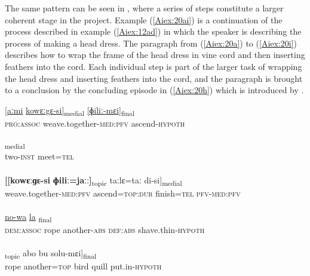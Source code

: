 \documentclass[output=paper]{LSP/langsci}
\begin{document}
	The same pattern can be seen in , where a series of steps constitute a larger coherent stage in the project. Example (\ref{Aiex:20ai}) is a continuation of the process described in example (\ref{Aiex:12ad}) in which the speaker is describing the process of making a head dress. The paragraph from (\ref{Aiex:20a}) to (\ref{Aiex:20i}) describes how to wrap the frame of the head dress in vine cord and then inserting feathers into the cord. Each individual step is part of the larger task of wrapping the head dress and inserting feathers into the cord, and the paragraph is brought to a conclusion by the concluding episode in (\ref{Aiex:20h}) which is introduced by .
	\begin{exe}
\ex \label{Aiex:20ai}
\begin{xlist}
\ex \label{Aiex:20a}
\gll \underline{[aːmi}		\underline{kowɛːgɛ-si]}\textsubscript{medial}	\underline{[ɸiliː-mɛi]}\textsubscript{final}\\
\textsc{pro:assoc}	weave.together\textsc{-med:pfv}	ascend\textsc{-hypoth}\\
\glt {}\\
\ex \label{Aiex:20b}
\gll [aːnɛ-kɛi	ɡo=taː]\textsubscript{medial}\\
two-\textsc{inst}	meet\textsc{=tel}\\
\glt {}\\
\ex \label{Aiex:20c}
\gll	\textbf{[[kowɛːɡɛ-si} \textbf{ɸiliː=jaːː]}\textsubscript{topic}	taːlɛ=taː	di-si]\textsubscript{medial}\\
weave.together\textsc{-med:pfv}	ascend\textsc{=top:dur}		finish\textsc{=tel}	\textsc{pfv-med:pfv}\\
\glt {}\\
\ex \label{Aiex:20d}
\gll \underline{\smash{[aːmi}}	\underline{}	\underline{no-wa}	\underline{la}	\underline{\smash{gaːlɛ-mɛi]}}\textsubscript{final}\\
\textsc{dem:assoc}	rope	another\textsc{-abs}	\textsc{def:abs}	shave.thin\textsc{-hypoth}\\
\glt {}\\
\ex \label{Aiex:20e}
\gll [[mɛgi	no=wa]\textsubscript{topic}	abo	bu	solu-mɛi]\textsubscript{final}\\
rope	another\textsc{=top}	bird	quill	put.in\textsc{-hypoth}\\
\glt {}\\

\end{xlist}
\end{exe}
\end{document}
